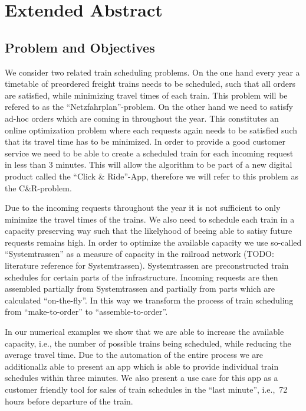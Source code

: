 \section{Extended Abstract}
\label{chap:extAbs}

\subsection{Problem and Objectives}
We consider two related train scheduling problems. On the one hand every year a timetable of preordered freight trains needs to be scheduled, such that all orders are satisfied, while minimizing travel times of each train. This problem will be refered to as the ``Netzfahrplan''-problem. On the other hand we need to satisfy ad-hoc orders which are coming in throughout the year. This constitutes an online optimization problem where each requests again needs to be satisfied such that its travel time has to be minimized. In order to provide a good customer service we need to be able to create a scheduled train for each incoming request in less than 3 minutes. This will allow the algorithm to be part of a new digital product called the ``Click \& Ride''-App, therefore we will refer to this problem as the C\&R-problem.

Due to the incoming requests throughout the year it is not sufficient to only minimize the travel times of the trains. We also need to schedule each train in a capacity preserving way such that the likelyhood of beeing able to satisy future requests remains high. In order to optimize the available capacity we use so-called ``Systemtrassen'' as a measure of capacity in the railroad network (TODO: literature reference for Systemtrassen). Systemtrassen are preconstructed train schedules for certain parts of the infrastructure. Incoming requests are then assembled partially from Systemtrassen and partially from parts which are calculated ``on-the-fly''.
In this way we transform the process of train scheduling from ``make-to-order'' to ``assemble-to-order''.

In our numerical examples we show that we are able to increase the available capacity, i.e., the number of possible trains being scheduled, while reducing the average travel time. Due to the automation of the entire process we are additionallz able to present an app which is able to provide individual train schedules within three minutes. We also present a use case for this app as a customer friendly tool for sales of train schedules in the ``last minute'', i.e.,\ 72 hours before departure of the train.

